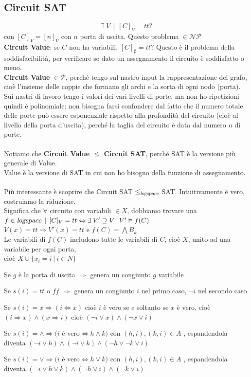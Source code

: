 \documentclass[10pt]{book}
\begin{document}
\subsection{Circuit SAT}
$$\exists\:V\:\:|\:\:[C]_V = tt ?$$ con $[C]_V = [n]_V$ con $n$ porta di uscita. Questo problema $\in \mathscr{NP}$\\
\textbf{Circuit Value}: se $C$ non ha variabili, $[C]_\emptyset = tt$? Questo è il problema della soddisfacibilità, per verificare se dato un assegnamento il circuito è soddisfatto o meno.\\
\textbf{Circuit Value} $\in \mathscr{P}$, perché tengo sul nastro input la rappresentazione del grafo, cioè l'insieme delle coppie che formano gli archi e la sorta di ogni nodo (porta). Sui nastri di lavoro tengo i valori dei vari livelli di porte, ma non ho ripetizioni quindi è polinomiale: non bisogna farsi confondere dal fatto che il numero totale delle porte può essere esponenziale rispetto alla profondità del circuito (cioè al livello della porta d'uscita), perché la taglia del circuito è data dal numero $n$ di porte.\\\\
Notiamo che \textbf{Circuit Value $\leq$ Circuit SAT}, perché SAT è la versione più generale di Value.\\Value è la versione di SAT in cui non ho bisogno della funzione di assegnamento.\\\\
Più interessante è scoprire che Circuit SAT $\leq_{\textsl{logspace}}$ SAT. Intuitivamente è vero, costruiamo la riduzione.\\
Significa che $\forall$ circuito con variabili $\in X$, dobbiamo trovare una $f \in \textsl{logspace}\:\:|\:\:[C]_V = tt \Leftrightarrow\exists\:V'\supseteq V\:\:\:V'\vDash f(C)$\\
$V(x) = tt \Rightarrow V'(x) = tt$ e $f(C) = \bigwedge B_k$\\
Le variabili di $f(C)$ includono tutte le variabili di $C$, cioè $X$, unito ad una variabile per ogni porta,\\cioè $X \cup \{x_i = i\:|\:i \in N\}$
\begin{list}{}{}
	\item Se $g$ è la porta di uscita $\Rightarrow$ genera un congiunto $g$ variabile
	\item Se $s(i) = tt$ o $ff$ $\Rightarrow$ genera un congiunto $i$ nel primo caso, $\neg i$ nel secondo caso
	\item Se $s(i) = x \Rightarrow (i \Leftrightarrow x)$ cioè $i$ è vero se e soltanto se $x$ è vero, cioè $(i \Rightarrow x) \wedge (x \Rightarrow i)$ cioè $(\neg i \vee x) \wedge (\neg x \vee i)$
	\item Se $s(i) = \wedge \Rightarrow (i$ è vero$ \Leftrightarrow h \wedge k)$ con  $(h,i), (k,i)\in A$ , espandendola diventa $(\neg i \vee h) \wedge (\neg i \vee k) \wedge (\neg h \vee \neg k \vee i)$
	\item Se $s(i) = \vee \Rightarrow (i$ è vero$ \Leftrightarrow h \vee k)$ con  $(h,i), (k,i)\in A$ , espandendola diventa $(\neg i \vee h \vee k) \wedge (\neg h \vee i) \wedge (\neg k \vee i)$
\end{list}
\pagebreak
\end{document}
